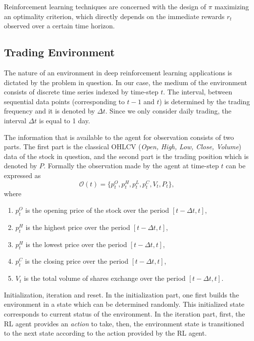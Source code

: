 \documentclass[twocolumn,aps,pra,superscriptaddress,nofootinbib,longbibliography]{revtex4-2}
\begin{document}
Reinforcement learning techniques are concerned with the design of \(\pi\) maximizing an optimality criterion, which directly depends on the immediate rewards \(r_t\) observed over a certain time horizon.  

\subsection{Trading Environment}

The nature of an environment in deep reinforcement learning applications is dictated by the problem in question. In our case, the medium of the environment consists of discrete time series indexed by time-step \(t\). The interval, between sequential data points (corresponding to \(t-1\) and \(t\)) is determined by the trading frequency and it is denoted by \(\Delta t\). Since we only consider daily trading, the interval \(\Delta t\) is equal to 1 day. 

The information that is available to the agent for observation consists of two parts. The first part is the classical OHLCV (\textit{Open, High, Low, Close, Volume}) data of the stock in question, and the second part is the trading position which is denoted by \(P\). 
Formally the observation made by the agent at time-step \(t\) can be expressed as 
\begin{equation}
    \mathcal{O}(t) = \{p_t^O, p_t^H, p_t^L, p_t^C, V_t, P_t\},
\end{equation}
where 
\begin{enumerate}[-]
    \item \(p_t^O\) is the opening price of the stock over the period \([t - \Delta t, t]\),
    \item \(p_t^H\) is the highest price over the period \([t - \Delta t, t]\),
    \item \(p_t^H\) is the lowest price over the period \([t - \Delta t, t]\),
    \item \(p_t^C\) is the closing price over the period \([t - \Delta t, t]\),
    \item \(V_t\) is the total volume of shares exchange over the period \([t - \Delta t, t]\).
\end{enumerate}




Initialization, iteration and reset. In the initialization part, one first builds the environment in a state which can be determined randomly. This initialized state corresponds to current status of the environment. In the iteration part, first, the RL agent provides an \textit{action} to take, then, the environment state is transitioned to the next state according to the action provided by the RL agent.
\end{document}
